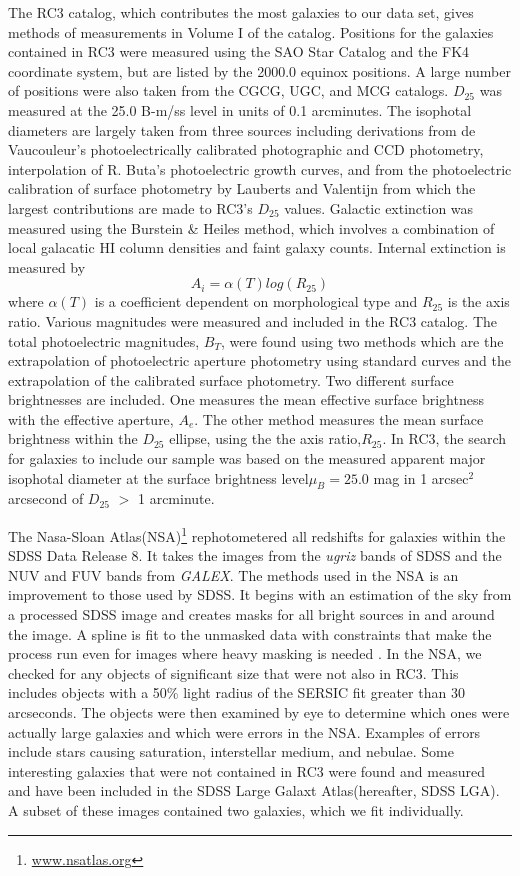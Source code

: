 \documentclass[12pt,preprint,pdftex]{aastex}
\begin{document}
The RC3 catalog, which contributes the most galaxies to our data set,
gives methods of measurements in Volume I of the catalog. Positions
for the galaxies contained in RC3 were measured using the SAO Star
Catalog and the FK4 coordinate system, but are listed by the 2000.0
equinox positions. A large number of positions were also taken from
the CGCG, UGC, and MCG catalogs. $D_{25}$ was measured at the 25.0
B-m/ss level in units of 0.1 arcminutes. The isophotal diameters are
largely taken from three sources including derivations from de
Vaucouleur's photoelectrically calibrated photographic and CCD
photometry, interpolation of R. Buta's\citep{buta} photoelectric
growth curves, and from the photoelectric calibration of surface
photometry by Lauberts and Valentijn\citep{lauberts} from which the
largest contributions are made to RC3's $D_{25}$ values. Galactic
extinction was measured using the Burstein \& Heiles\citep{bh} method,
which involves a combination of local galacatic HI column densities
and faint galaxy counts. Internal extinction is measured
by \begin{equation} A_i= \alpha(T)log(R_{25}) \end{equation} where
$\alpha(T)$ is a coefficient dependent on morphological type and
$R_{25}$ is the axis ratio. Various magnitudes were measured and
included in the RC3 catalog. The total photoelectric magnitudes,
$B_T$, were found using two methods which are the extrapolation of
photoelectric aperture photometry using standard curves and the
extrapolation of the calibrated surface photometry. Two different
surface brightnesses are included. One measures the mean effective
surface brightness with the effective aperture, $A_e$. The other
method measures the mean surface brightness within the $D_{25}$
ellipse, using the the axis ratio,$R_{25}$\citep{rc3}.  In RC3, the
search for galaxies to include our sample was based on the measured
apparent major isophotal diameter at the surface brightness
level$\mu_{B}=25.0$ mag in 1 arcsec$^2$ arcsecond of $D_{25}$ $>$ 1
arcminute.

The Nasa-Sloan Atlas(NSA)\footnote{\url{www.nsatlas.org}}
rephotometered all redshifts for galaxies within the SDSS Data Release
8. It takes the images from the \textit{ugriz} bands of SDSS and the
NUV and FUV bands from \textit{GALEX}. The methods used in the NSA is
an improvement to those used by SDSS. It begins with an estimation of
the sky from a processed SDSS image and creates masks for all bright
sources in and around the image. A spline is fit to the unmasked data
with constraints that make the process run even for images where heavy
masking is needed \citep{blanton11}. In the NSA, we checked for any
objects of significant size that were not also in RC3. This includes
objects with a 50\% light radius of the SERSIC fit greater than 30
arcseconds. The objects were then examined by eye to determine which
ones were actually large galaxies and which were errors in the
NSA. Examples of errors include stars causing saturation, interstellar
medium, and nebulae. Some interesting galaxies that were not contained
in RC3 were found and measured and have been included in the SDSS
Large Galaxt Atlas(hereafter, SDSS LGA). A subset of these images
contained two galaxies, which we fit individually.
\end{document}
